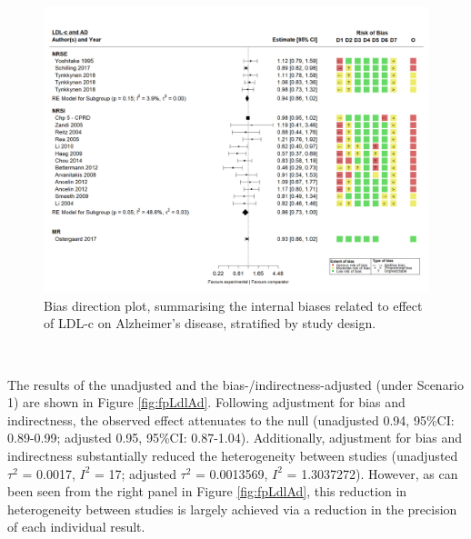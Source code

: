 \documentclass[a4paper, twoside]{templates/ociamthesis}
\begin{document}
~





\begin{figure}[H]
\includegraphics[width=1\linewidth]{figures/tri/midlife_AD} \caption[Bias direction plot for LDL-c/Alzheimer's disease]{Bias direction plot, summarising the internal biases related to effect of LDL-c on Alzheimer's disease, stratified by study design.}\label{fig:ldlAdBiasDirection}
\end{figure}

~

The results of the unadjusted and the bias-/indirectness-adjusted (under Scenario 1) are shown in Figure \ref{fig:fpLdlAd}. Following adjustment for bias and indirectness, the observed effect attenuates to the null (unadjusted 0.94, 95\%CI: 0.89-0.99; adjusted 0.95, 95\%CI: 0.87-1.04). Additionally, adjustment for bias and indirectness substantially reduced the heterogeneity between studies (unadjusted \(\tau^2\) = 0.0017, \(I^2\) = 17; adjusted \(\tau^2\) = 0.0013569, \(I^2\) = 1.3037272). However, as can been seen from the right panel in Figure \ref{fig:fpLdlAd}, this reduction in heterogeneity between studies is largely achieved via a reduction in the precision of each individual result.

~
\end{document}
